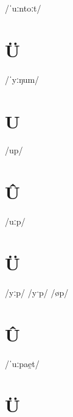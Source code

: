 \documentclass[10pt,a4paper,twoside]{book}
\begin{document}
\begin{multicols}{3}
 {/ˈuːntoːt/} {}
\end{multicols}

\section*{Ü}

\begin{multicols}{3}
 {/ˈyːŋum/} {}
\end{multicols}

\section*{U}

\begin{multicols}{3}
 {/up/} {}
\end{multicols}

\section*{Û}

\begin{multicols}{3}
 {/uːp/} {}
\end{multicols}

\section*{Ü}

\begin{multicols}{3}
 {/yːp/} {}
 {/yˑp/} {}
 {/øp/} {}
\end{multicols}

\section*{Û}

\begin{multicols}{3}
 {/ˈuːpae̯t/} {}
\end{multicols}

\section*{Ü}
\end{document}
